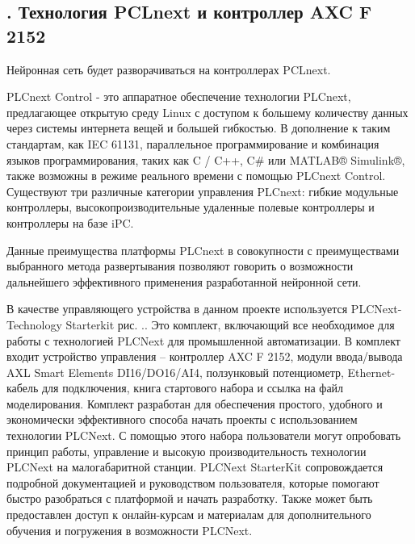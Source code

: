 \subtitlespace

\subsection*{ 
	\gostTitleFont
	\redline
	\thechaptercntr .\thesubchaptercntr \spc
	Технология PCLnext и контроллер AXC F 2152
} \addtocounter{subchaptercntr}{1}

\subtitlespace

{\gostFont
	
	\par \redline Нейронная сеть будет разворачиваться на контроллерах PCLnext.
	
	\par \redline PLCnext Control - это аппаратное обеспечение технологии PLCnext, предлагающее открытую среду Linux с доступом к большему количеству данных через системы интернета вещей и большей гибкостью. В дополнение к таким стандартам, как IEC 61131, параллельное программирование и комбинация языков программирования, таких как C / C++, C\# или MATLAB® Simulink®, также возможны в режиме реального времени с помощью PLCnext Control. Существуют три различные категории управления PLCnext: гибкие модульные контроллеры, высокопроизводительные удаленные полевые контроллеры и контроллеры на базе iPC.  
	
	\par \redline Данные преимущества платформы PLCnext в совокупности с преимуществами выбранного метода развертывания позволяют говорить о возможности дальнейшего эффективного применения разработанной нейронной сети.  
	
	\par \redline В качестве управляющего устройства в данном проекте используется PLCNext-Technology Starterkit  рис. \thechaptercntr.\theimagecntr. Это комплект, включающий все необходимое для работы с технологией PLCNext для промышленной автоматизации. В комплект входит устройство управления {--} контроллер AXC F 2152, модули ввода/вывода AXL Smart Elements DI16/DO16/AI4, ползунковый потенциометр, Ethernet-кабель для подключения, книга стартового набора и ссылка на файл моделирования. Комплект разработан для обеспечения простого, удобного и экономически эффективного способа начать проекты с использованием технологии PLCNext. С помощью этого набора пользователи могут опробовать принцип работы, управление и высокую производительность технологии PLCNext на малогабаритной станции. PLCNext StarterKit сопровождается подробной документацией и руководством пользователя, которые помогают быстро разобраться с платформой и начать разработку. Также может быть предоставлен доступ к онлайн-курсам и материалам для дополнительного обучения и погружения в возможности PLCNext.
	
}
